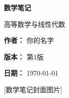 \begin{titlepage}
    \centering
    \vspace*{2cm}
    {\Huge\textbf{数学笔记} \par} %
    \vspace{1cm}
    {\LARGE 高等数学与线性代数 \par} %
    \vspace{1.5cm}
    {\Large \textbf{作者：} 你的名字 \par} %
    \vspace{0.5cm}
    {\Large \textbf{版本：} 第1版 \par} %
    \vspace{0.5cm}
    {\Large \textbf{日期：} \today \par} %
    \vfill
    {\Large [数学笔记封面图片]}
\end{titlepage}